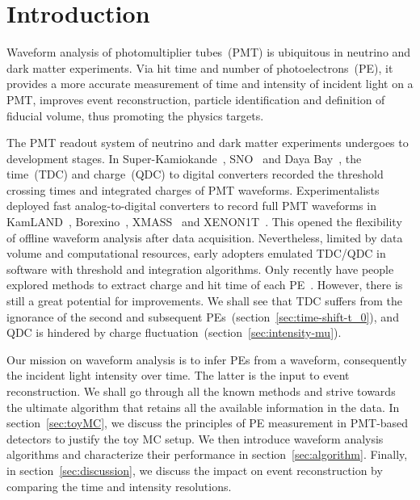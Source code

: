 \section{Introduction}
\label{sec:introduction}

Waveform analysis of photomultiplier tubes~(PMT) is ubiquitous in neutrino and dark matter experiments.  Via hit time and number of photoelectrons~(PE), it provides a more accurate measurement of time and intensity of incident light on a PMT, improves event reconstruction, particle identification and definition of fiducial volume, thus promoting the physics targets.

The PMT readout system of neutrino and dark matter experiments undergoes to development stages. In Super-Kamiokande~\cite{noauthor_super-kamiokande_2003}, SNO~\cite{dunger_event_2019} and Daya Bay~\cite{daya_bay_collaboration_measurement_2017}, the time~(TDC) and charge~(QDC) to digital converters recorded the threshold crossing times and integrated charges of PMT waveforms.  Experimentalists deployed fast analog-to-digital converters to record full PMT waveforms in KamLAND~\cite{kamland_collaboration_production_2010}, Borexino~\cite{alimonti_borexino_2009}, XMASS~\cite{abe_xmass_2013} and XENON1T~\cite{xenon_collaboration_xenon1t_2019}.  This opened the flexibility of offline waveform analysis after data acquisition.  Nevertheless, limited by data volume and computational resources, early adopters emulated TDC/QDC in software with threshold and integration algorithms.  Only recently have people explored methods to extract charge and hit time of each PE~\cite{zhang_comparison_2019}.  However, there is still a great potential for improvements.  We shall see that TDC suffers from the ignorance of the second and subsequent PEs~(section~\ref{sec:time-shift-t_0}), and QDC is hindered by charge fluctuation~(section~\ref{sec:intensity-mu}).

Our mission on waveform analysis is to infer PEs from a waveform, consequently the incident light intensity over time.  The latter is the input to event reconstruction.  We shall go through all the known methods and strive towards the ultimate algorithm that retains all the available information in the data.  In section~\ref{sec:toyMC}, we discuss the principles of PE measurement in PMT-based detectors to justify the toy MC setup.  We then introduce waveform analysis algorithms and characterize their performance in section~\ref{sec:algorithm}.  Finally, in section~\ref{sec:discussion}, we discuss the impact on event reconstruction by comparing the time and intensity resolutions.
